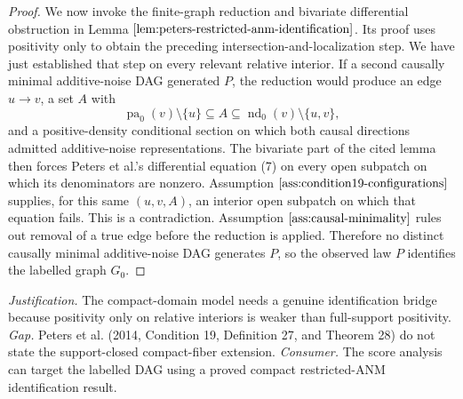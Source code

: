 \documentclass{article}
\begin{document}
\begin{proof}
We now invoke the finite-graph reduction and bivariate differential obstruction in Lemma \(\ref{lem:peters-restricted-anm-identification}\).  Its proof uses positivity only to obtain the preceding intersection-and-localization step.  We have just established that step on every relevant relative interior.  If a second causally minimal additive-noise DAG generated \(P\), the reduction would produce an edge \(u\to v\), a set \(A\) with
\[
 \operatorname{pa}_0(v)\setminus\{u\}\subseteq A
 \subseteq\operatorname{nd}_0(v)\setminus\{u,v\},
\]
and a positive-density conditional section on which both causal directions admitted additive-noise representations.  The bivariate part of the cited lemma then forces Peters et al.'s differential equation (7) on every open subpatch on which its denominators are nonzero.  Assumption \(\ref{ass:condition19-configurations}\) supplies, for this same \((u,v,A)\), an interior open subpatch on which that equation fails.  This is a contradiction.  Assumption \(\ref{ass:causal-minimality}\) rules out removal of a true edge before the reduction is applied.  Therefore no distinct causally minimal additive-noise DAG generates \(P\), so the observed law \(P\) identifies the labelled graph \(G_0\).
\end{proof}
\par\smallskip\noindent \textit{Justification.} The compact-domain model needs a genuine identification bridge because positivity only on relative interiors is weaker than full-support positivity. \textit{Gap.} Peters et al. (2014, Condition 19, Definition 27, and Theorem 28) do not state the support-closed compact-fiber extension. \textit{Consumer.} The score analysis can target the labelled DAG using a proved compact restricted-ANM identification result.
\end{document}
